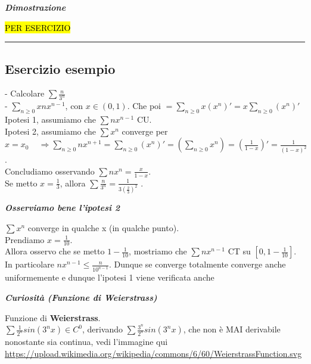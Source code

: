\documentclass{article}
\theoremstyle{definition}
\newcommand{\linea}{\vspace{15pt}\hrule\vspace{15pt}}
\begin{document}
\begin{center}
    \textbf{\textit{Dimostrazione}}
\end{center}
\hl{PER ESERCIZIO}





\linea
\subsection{Esercizio esempio}
- Calcolare $\sum \frac{n}{3^n}$ \\
- $\sum_{n \geqslant 0} xnx^{n-1}$, con $x \in (0,1)$. Che poi $=\sum_{n \geqslant 0} x (x^n)'=x\sum_{n \geqslant 0}(x^n)'$
\\
Ipotesi 1, assumiamo che $\sum nx^{n-1}$ CU.
\\
Ipotesi 2, assumiamo che $\sum x^n$ converge per $x=x_0 \,\,\,\,\,\,\, \Longrightarrow \sum_{n \geqslant 0}nx^{n+1}=\sum_{n \geqslant 0}(x^n)'=\left(\sum_{n \geqslant 0} x^n\right)=\left(\frac{1}{1-x}\right)'=\frac{1}{(1-x)^2}$.
\\
Concludiamo osservando $\sum n x^n = \frac{x}{1-x}$.
\\
Se metto $x=\frac{1}{3}$, allora $\sum \frac{n}{3^n}=\frac{1}{3\left(\frac{2}{3}\right)^2}$
.
\\
\begin{center}
    \textbf{\textit{Osserviamo bene l'ipotesi 2}}
\end{center}
$\sum x^n$ converge in qualche x (in qualche punto).
\\
Prendiamo $x=\frac{1}{10}$.
\\
Allora osservo che se metto $1-\frac{1}{10}$, mostriamo che $\sum n x^{n-1}$ CT su $[0,1-\frac{1}{10}]$.
\\
In particolare $nx^{n-1} \leqslant \frac{n}{10^{n-1}}$. Dunque se converge totalmente converge anche uniformemente e dunque l'ipotesi 1 viene verificata anche

\begin{center}
    \textbf{\textit{Curiosità (Funzione di Weierstrass)}}
\end{center} 
Funzione di \textbf{Weierstrass}.
\\
$\sum \frac{1}{2^n}sin(3^nx) \in C^0$, derivando $\sum \frac{3^n}{2^n}sin(3^n x)$, che non è MAI derivabile nonostante sia continua, vedi l'immagine qui \url{https://upload.wikimedia.org/wikipedia/commons/6/60/WeierstrassFunction.svg}

\end{document}
